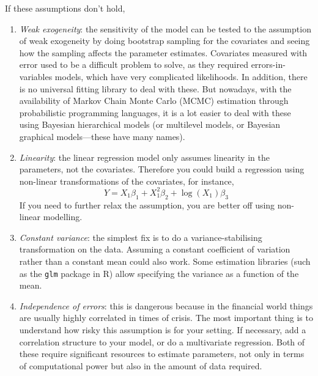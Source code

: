 \documentclass{article}
\begin{document}
    If these assumptions don't hold, 
    \begin{enumerate}
      \item \textit{Weak exogeneity}: the sensitivity of the model can be tested to the assumption of weak exogeneity by doing bootstrap sampling for the covariates and seeing how the sampling affects the parameter estimates.
      Covariates measured with error used to be a difficult problem to solve, as they required errors-in-variables models, which have very complicated likelihoods. In addition, there is no universal fitting library to deal with these. But nowadays, with the availability of Markov Chain Monte Carlo (MCMC) estimation through probabilistic programming languages, it is a lot easier to deal with these using Bayesian hierarchical models (or multilevel models, or Bayesian graphical models---these have many names).

      \item \textit{Linearity}: the linear regression model only assumes linearity in the parameters, not the covariates. Therefore you could build a regression using non-linear transformations of the covariates, for instance,
      \begin{equation}
        Y = X_1 \beta_1 + X_1^2 \beta_2 + \log(X_1) \beta_3
      \end{equation}
      If you need to further relax the assumption, you are better off using non-linear modelling. 

      \item \textit{Constant variance}: the simplest fix is to do a variance-stabilising transformation on the data. Assuming a constant coefficient of variation rather than a constant mean could also work. Some estimation libraries (such as the \verb+glm+ package in R) allow specifying the variance as a function of the mean.

      \item \textit{Independence of errors}: this is dangerous because in the financial world things are usually highly correlated in times of crisis. The most important thing is to understand how risky this assumption is for your setting. If necessary, add a correlation structure to your model, or do  a multivariate regression. Both of these require significant resources to estimate parameters, not only in terms of computational power but also in the amount of data required.


\end{enumerate}
\end{document}
